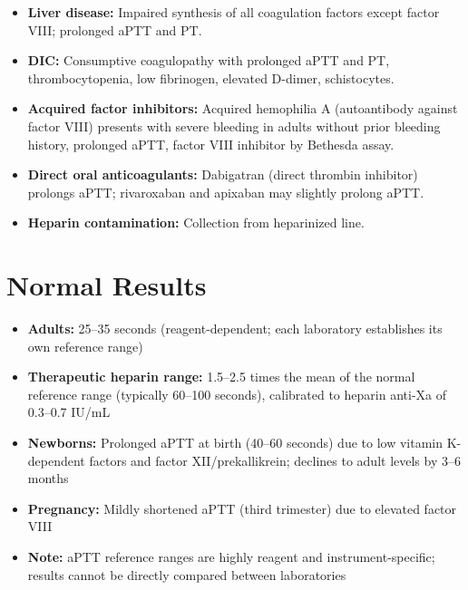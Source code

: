 \begin{itemize}
  \item \textbf{Liver disease:} Impaired synthesis of all coagulation factors except factor VIII; prolonged aPTT and PT.
  \item \textbf{DIC:} Consumptive coagulopathy with prolonged aPTT and PT, thrombocytopenia, low fibrinogen, elevated D-dimer, schistocytes.
  \item \textbf{Acquired factor inhibitors:} Acquired hemophilia A (autoantibody against factor VIII) presents with severe bleeding in adults without prior bleeding history, prolonged aPTT, factor VIII inhibitor by Bethesda assay.
  \item \textbf{Direct oral anticoagulants:} Dabigatran (direct thrombin inhibitor) prolongs aPTT; rivaroxaban and apixaban may slightly prolong aPTT.
  \item \textbf{Heparin contamination:} Collection from heparinized line.
\end{itemize}

\section*{Normal Results}
\begin{itemize}
  \item \textbf{Adults:} 25--35 seconds (reagent-dependent; each laboratory establishes its own reference range)
  \item \textbf{Therapeutic heparin range:} 1.5--2.5 times the mean of the normal reference range (typically 60--100 seconds), calibrated to heparin anti-Xa of 0.3--0.7 IU/mL
  \item \textbf{Newborns:} Prolonged aPTT at birth (40--60 seconds) due to low vitamin K-dependent factors and factor XII/prekallikrein; declines to adult levels by 3--6 months
  \item \textbf{Pregnancy:} Mildly shortened aPTT (third trimester) due to elevated factor VIII
  \item \textbf{Note:} aPTT reference ranges are highly reagent and instrument-specific; results cannot be directly compared between laboratories
\end{itemize}

